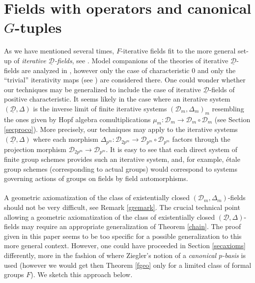 \documentclass[10pt]{amsart}
\theoremstyle{definition}
\begin{document}
\section{Fields with operators and canonical $G$-tuples}\label{msecop}
\noindent
As we have mentioned several times, $F$-iterative fields fit to the more general set-up of \emph{iterative $\underline{\mathcal{D}}$-fields}, see \cite{MS}. Model companions of the theories of iterative $\underline{\mathcal{D}}$-fields are analyzed in \cite{MS2}, however only the case of characteristic $0$ and only the ``trivial'' iterativity maps (see \cite[Section 6.1]{MS2}) are considered there. One could wonder whether our techniques may be generalized to include the case of iterative $\underline{\mathcal{D}}$-fields of positive characteristic. It seems likely in the case where an iterative system $(\underline{\mathcal{D}},\Delta)$ is the inverse limit of finite iterative systems $(\mathcal{D}_m,\Delta_m)_m$ resembling the ones given by Hopf algebra comultiplications $\mu_m:\mathcal{D}_m\to \mathcal{D}_m\circ \mathcal{D}_m$ (see Section \ref{secproco}). More precisely, our techniques may apply to the iterative systems $(\underline{\mathcal{D}},\Delta)$ where each morphism $\Delta_{p^m}:\mathcal{D}_{2p^m}\to \mathcal{D}_{p^m}\circ \mathcal{D}_{p^m}$ factors through the projection morphism $\mathcal{D}_{2p^m}\to \mathcal{D}_{p^m}$. It is easy to see that each direct system of finite group schemes provides such an iterative system, and, for example, \'{e}tale group schemes (corresponding to actual groups) would correspond to systems governing actions of groups on fields by field automorphisms.
\\
\\
A geometric axiomatization of the class of existentially closed $(\mathcal{D}_m,\Delta_m)$-fields should not be very difficult, see Remark \ref{gremark}. The crucial technical point allowing a geometric axiomatization of the class of existentially closed $(\underline{\mathcal{D}},\Delta)$-fields may require an appropriate generalization of Theorem \ref{chain}. The proof given in this paper seems to be too specific for a possible generalization to this more general context. However, one could have proceeded in Section \ref{secaxioms} differently, more in the fashion of \cite{K3} where Ziegler's notion of a \emph{canonical $p$-basis} is used (however we would get then Theorem \ref{fgeo} only for a limited class of formal groups $F$). We sketch this approach below.
\end{document}
